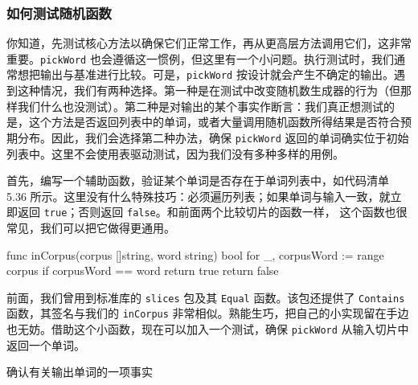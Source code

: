 \subsubsection*{如何测试随机函数}

你知道，先测试核心方法以确保它们正常工作，再从更高层方法调用它们，这非常重要。\texttt{pickWord} 也会遵循这一惯例，但这里有一个小问题。执行测试时，我们通常想把输出与基准进行比较。可是，\texttt{pickWord} 按设计就会产生不确定的输出。遇到这种情况，我们有两种选择。第一种是在测试中改变随机数生成器的行为（但那样我们什么也没测试）。第二种是对输出的某个事实作断言：我们真正想测试的是，这个方法是否返回列表中的单词，或者大量调用随机函数所得结果是否符合预期分布。因此，我们会选择第二种办法，确保 \texttt{pickWord} 返回的单词确实位于初始列表中。这里不会使用表驱动测试，因为我们没有多种多样的用例。

首先，编写一个辅助函数，验证某个单词是否存在于单词列表中，如代码清单 5.36 所示。这里没有什么特殊技巧：必须遍历列表；如果单词与输入一致，就立即返回 \texttt{true}；否则返回 \texttt{false}。和前面两个比较切片的函数一样，
这个函数也很常见，我们可以把它做得更通用。

\begin{gocode}[title={代码清单 5.36 corpus\_internal\_test.go：辅助函数 \texttt{inCorpus()}}]
func inCorpus(corpus []string, word string) bool {
    for _, corpusWord := range corpus {
        if corpusWord == word {
            return true
        }
    }
    return false
}
\end{gocode}

前面，我们曾用到标准库的 \texttt{slices} 包及其 \texttt{Equal} 函数。该包还提供了 \texttt{Contains} 函数，其签名与我们的 \texttt{inCorpus} 非常相似。熟能生巧，把自己的小实现留在手边也无妨。借助这个小函数，现在可以加入一个测试，确保 \texttt{pickWord} 从输入切片中返回一个单词。


\begin{codeannotations}
\item 确认有关输出单词的一项事实
\end{codeannotations}

